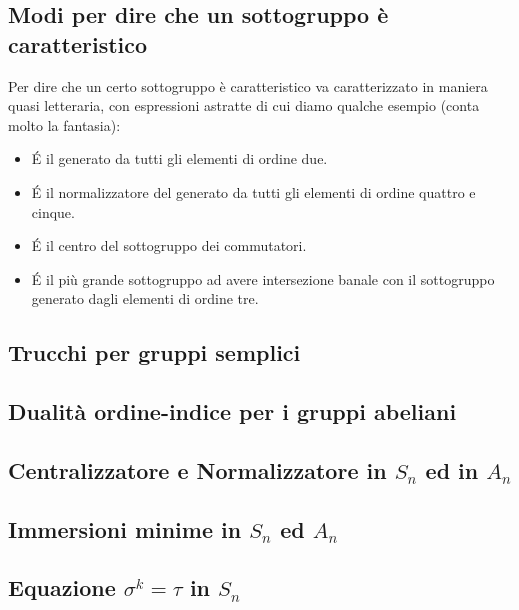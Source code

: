 \documentclass[a4paper,NoNotes,GeneralMath]{stdmdoc}
\begin{document}
	\subsection{Modi per dire che un sottogruppo è caratteristico}
	Per dire che un certo sottogruppo è caratteristico va caratterizzato in maniera quasi letteraria, con espressioni astratte di cui diamo qualche esempio (conta molto la fantasia):
	\begin{itemize}
		\item \'E il generato da tutti gli elementi di ordine due.
		\item \'E il normalizzatore del generato da tutti gli elementi di ordine quattro e cinque.
		\item \'E il centro del sottogruppo dei commutatori.
		\item \'E il più grande sottogruppo ad avere intersezione banale con il sottogruppo generato dagli elementi di ordine tre.
	\end{itemize}

	\subsection{Trucchi per gruppi semplici}

	\subsection{Dualità ordine-indice per i gruppi abeliani}
	
	\subsection{Centralizzatore e Normalizzatore in $S_n$ ed in $A_n$}

	\subsection{Immersioni minime in $S_n$ ed $A_n$}
	
	\subsection{Equazione $\sigma^k = \tau$ in $S_n$}
	
\end{document}
